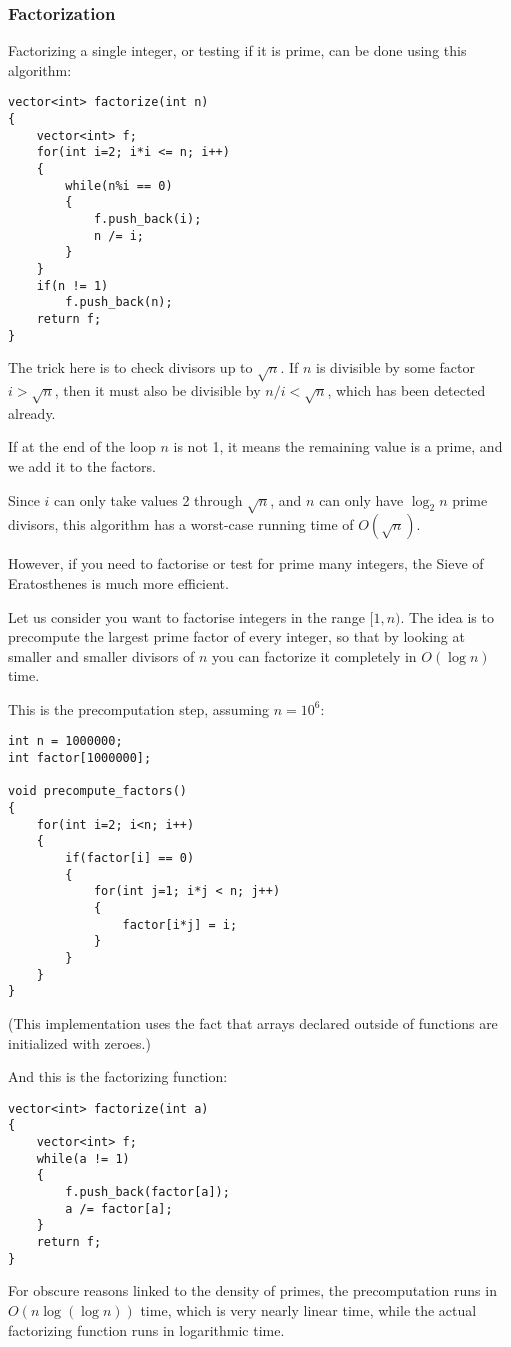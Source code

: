 \subsubsection{Factorization}

Factorizing a single integer, or testing if it is prime, can be done
using this algorithm:

\begin{verbatim}
vector<int> factorize(int n)
{
    vector<int> f;
    for(int i=2; i*i <= n; i++)
    {
        while(n%i == 0)
        {
            f.push_back(i);
            n /= i;
        }
    }
    if(n != 1)
        f.push_back(n);
    return f;
}
\end{verbatim}

The trick here is to check divisors up to $\sqrt{n}$.
If $n$ is divisible by some factor $i > \sqrt{n}$, then it must also
be divisible by $n/i < \sqrt{n}$, which has been detected already.

If at the end of the loop $n$ is not 1, it means the remaining value is a prime,
and we add it to the factors.

Since $i$ can only take values 2 through $\sqrt{n}$,
and $n$ can only have $\log_2n$ prime divisors,
this algorithm has a worst-case running time of $O(\sqrt{n})$.

However, if you need to factorise or test for prime many integers, the Sieve of
Eratosthenes is much more efficient.

Let us consider you want to factorise integers in the range $[1,n)$.
The idea is to precompute the largest prime factor of every integer,
so that by looking at smaller and smaller divisors of $n$ you can factorize
it completely in $O(\log n)$ time.

This is the precomputation step, assuming $n=10^6$:

\begin{verbatim}
int n = 1000000;
int factor[1000000];

void precompute_factors()
{
    for(int i=2; i<n; i++)
    {
        if(factor[i] == 0)
        {
            for(int j=1; i*j < n; j++)
            {
                factor[i*j] = i;
            }
        }
    }
}
\end{verbatim}

(This implementation uses the fact that arrays declared
outside of functions
are initialized with zeroes.)

And this is the factorizing function:

\begin{verbatim}
vector<int> factorize(int a)
{
    vector<int> f;
    while(a != 1)
    {
        f.push_back(factor[a]);
        a /= factor[a];
    }
    return f;
}
\end{verbatim}

For obscure reasons linked to the density of primes, the precomputation
runs in $O(n \log(\log n))$ time, which is very nearly linear time,
while the actual factorizing function runs in logarithmic time.

